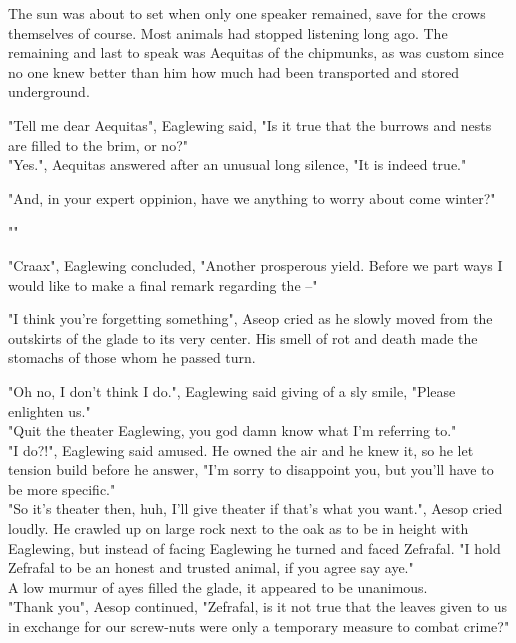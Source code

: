 \documentclass[smalldemyvopaper,11pt,twoside,onecolumn,openright,extrafontsizes]{memoir}
\begin{document}
The sun was about to set when only one speaker remained, save for the crows themselves of course. Most animals had stopped listening long ago. The remaining and last to speak was Aequitas of the chipmunks, as was custom since no one knew better than him how much had been transported and stored underground.

"Tell me dear Aequitas", Eaglewing said, "Is it true that the burrows and nests are filled to the brim, or no?" \\

"Yes.", Aequitas answered after an unusual long silence, "It is indeed true."

"And, in your expert oppinion, have we anything to worry about come winter?"

""

"Craax", Eaglewing concluded, "Another prosperous yield. Before we part ways I would like to make a final remark regarding the --"

"I think you're forgetting something", Aseop cried as he slowly moved from the outskirts of the glade to its very center. His smell of rot and death made the stomachs of those whom he passed turn. 

"Oh no, I don't think I do.", Eaglewing said giving of a sly smile, "Please enlighten us."\\

"Quit the theater Eaglewing, you god damn know what I'm referring to."\\

"I do?!", Eaglewing said amused. He owned the air and he knew it, so he let tension build before he answer, "I'm sorry to disappoint you, but you'll have to be more specific."\\

"So it's theater then, huh, I'll give theater if that's what you want.", Aesop cried loudly. He crawled up on large rock next to the oak as to be in height with Eaglewing, but instead of facing Eaglewing he turned and faced Zefrafal. "I hold Zefrafal to be an honest and trusted animal, if you agree say aye."\\

A low murmur of ayes filled the glade, it appeared to be unanimous.\\

"Thank you", Aesop continued, "Zefrafal, is it not true that the leaves given to us in exchange for our screw-nuts were only a temporary measure to combat crime?"\\
\end{document}
